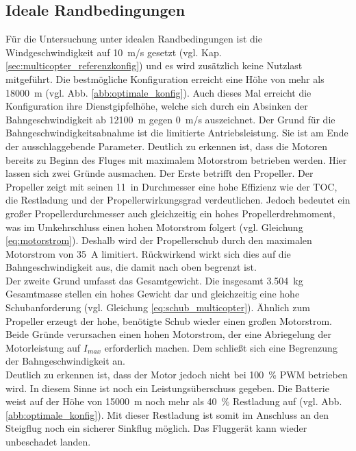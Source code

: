 \subsection{Ideale Randbedingungen}
\label{subsec:ideale_rb}
Für die Untersuchung unter idealen Randbedingungen ist die Windgeschwindigkeit auf \SI{10}{m/s} gesetzt (vgl. Kap. \ref{sec:multicopter_referenzkonfig}) und es wird zusätzlich keine  Nutzlast mitgeführt.
Die bestmögliche Konfiguration erreicht eine Höhe von  mehr als \SI{18000}{m} (vgl. Abb. \ref{abb:optimale_konfig}). Auch dieses Mal erreicht die Konfiguration ihre Dienstgipfelhöhe, welche sich durch ein Absinken der Bahngeschwindigkeit ab \SI{12100}{m} gegen \SI{0}{m/s} auszeichnet. Der Grund für die Bahngeschwindigkeitsabnahme ist die limitierte Antriebsleistung. Sie ist am Ende der ausschlaggebende Parameter. Deutlich zu erkennen ist, dass die Motoren bereits zu Beginn des Fluges mit maximalem Motorstrom betrieben werden. Hier lassen sich zwei Gründe ausmachen.
Der Erste betrifft den Propeller. Der Propeller zeigt mit seinen \SI{11}{in} Durchmesser eine hohe Effizienz wie der TOC, die Restladung und der Propellerwirkungsgrad verdeutlichen. Jedoch bedeutet ein großer Propellerdurchmesser auch gleichzeitig ein hohes Propellerdrehmoment, was im Umkehrschluss einen hohen Motorstrom folgert (vgl. Gleichung \eqref{eq:motorstrom}). Deshalb wird der Propellerschub durch den maximalen Motorstrom von \SI{35}{A} limitiert. Rückwirkend wirkt sich dies auf die Bahngeschwindigkeit aus, die damit nach oben begrenzt ist. \\
Der zweite Grund umfasst das Gesamtgewicht. Die insgesamt \SI{3,504}{kg} Gesamtmasse stellen ein hohes Gewicht dar und gleichzeitig eine hohe Schubanforderung (vgl. Gleichung \eqref{eq:schub_multicopter}). Ähnlich zum Propeller erzeugt der hohe, benötigte Schub wieder einen großen Motorstrom. \\
Beide Gründe verursachen einen hohen Motorstrom, der eine Abriegelung der Motorleistung auf \ensuremath{I_{max}} erforderlich machen. Dem schließt sich eine Begrenzung der Bahngeschwindigkeit an. \\
Deutlich zu erkennen ist, dass der Motor jedoch nicht bei \SI{100}{\%} PWM betrieben wird. In diesem Sinne ist noch ein Leistungsüberschuss gegeben.
Die Batterie weist auf der Höhe von \SI{15000}{m} noch mehr als \SI{40}{\%} Restladung auf (vgl. Abb. \ref{abb:optimale_konfig}). Mit dieser Restladung ist somit im Anschluss an den Steigflug noch ein sicherer Sinkflug möglich. Das Fluggerät kann wieder unbeschadet landen.


